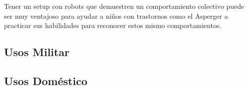 Tener un setup con robots que demuestren un comportamiento colectivo puede ser muy ventajoso para ayudar a niños con trastornos como el Asperger a practicar sus habilidades para reconocer estos mismo comportamientos.

\subsection{Usos Militar}

\subsection{Usos Doméstico}

